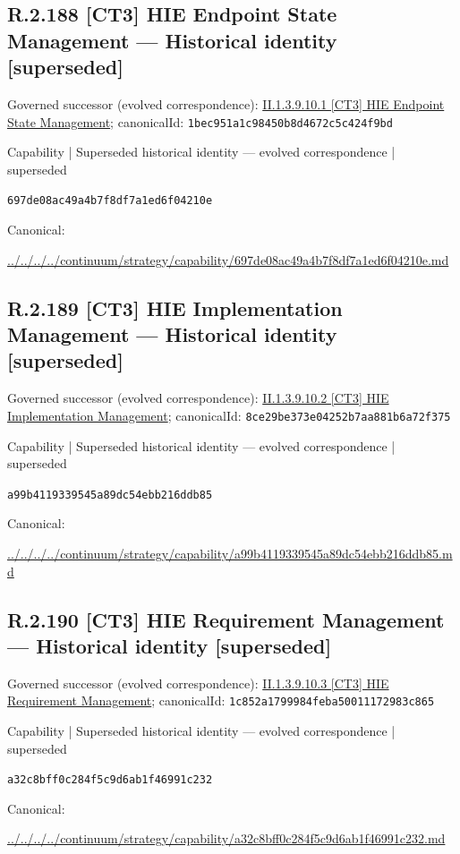 \documentclass[10pt,a4paper]{article}
\begin{document}
\subsection*{R.2.188 [CT3] HIE Endpoint State Management — Historical identity [superseded]}
Governed successor (evolved correspondence): \hyperref[element-1bec951a1c98450b8d4672c5c424f9bd]{II.1.3.9.10.1 [CT3] HIE Endpoint State Management}; canonicalId: \texttt{1bec951a1c98450b8d4672c5c424f9bd}\par
\label{element-697de08ac49a4b7f8df7a1ed6f04210e}
{\small Capability | Superseded historical identity — evolved correspondence | superseded}\par
\texttt{697de08ac49a4b7f8df7a1ed6f04210e}\par
Canonical: \par
{\footnotesize\url{../../../../continuum/strategy/capability/697de08ac49a4b7f8df7a1ed6f04210e.md}}\par
\subsection*{R.2.189 [CT3] HIE Implementation Management — Historical identity [superseded]}
Governed successor (evolved correspondence): \hyperref[element-8ce29be373e04252b7aa881b6a72f375]{II.1.3.9.10.2 [CT3] HIE Implementation Management}; canonicalId: \texttt{8ce29be373e04252b7aa881b6a72f375}\par
\label{element-a99b4119339545a89dc54ebb216ddb85}
{\small Capability | Superseded historical identity — evolved correspondence | superseded}\par
\texttt{a99b4119339545a89dc54ebb216ddb85}\par
Canonical: \par
{\footnotesize\url{../../../../continuum/strategy/capability/a99b4119339545a89dc54ebb216ddb85.md}}\par
\subsection*{R.2.190 [CT3] HIE Requirement Management — Historical identity [superseded]}
Governed successor (evolved correspondence): \hyperref[element-1c852a1799984feba50011172983c865]{II.1.3.9.10.3 [CT3] HIE Requirement Management}; canonicalId: \texttt{1c852a1799984feba50011172983c865}\par
\label{element-a32c8bff0c284f5c9d6ab1f46991c232}
{\small Capability | Superseded historical identity — evolved correspondence | superseded}\par
\texttt{a32c8bff0c284f5c9d6ab1f46991c232}\par
Canonical: \par
{\footnotesize\url{../../../../continuum/strategy/capability/a32c8bff0c284f5c9d6ab1f46991c232.md}}\par
\end{document}
